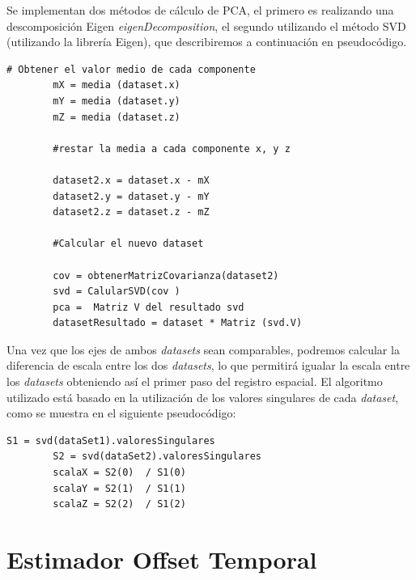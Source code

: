 	Se implementan dos métodos de cálculo de PCA, el primero es realizando una descomposición Eigen \textit{eigenDecomposition}, el segundo utilizando el método SVD (utilizando la librería Eigen), que describiremos a continuación en pseudocódigo.

	\begin{lstlisting}[frame=single]
		# Obtener el valor medio de cada componente
		mX = media (dataset.x)
		mY = media (dataset.y)
		mZ = media (dataset.z)

		#restar la media a cada componente x, y z

		dataset2.x = dataset.x - mX
		dataset2.y = dataset.y - mY
		dataset2.z = dataset.z - mZ
        
        #Calcular el nuevo dataset

		cov = obtenerMatrizCovarianza(dataset2)
		svd = CalularSVD(cov )
		pca =  Matriz V del resultado svd
		datasetResultado = dataset * Matriz (svd.V)

	\end{lstlisting}

    Una vez que los ejes de ambos \textit{datasets} sean comparables, podremos calcular la diferencia de escala entre los dos \textit{datasets}, lo que permitirá igualar la escala entre los \textit{datasets} obteniendo así el primer paso del registro espacial. El algoritmo utilizado está basado en la utilización de los valores singulares de cada \textit{dataset}, como se muestra en el siguiente pseudocódigo:

        
	\begin{lstlisting}[frame=single]
		S1 = svd(dataSet1).valoresSingulares
		S2 = svd(dataSet2).valoresSingulares
		scalaX = S2(0)  / S1(0)
		scalaY = S2(1)  / S1(1)
		scalaZ = S2(2)  / S1(2)
	\end{lstlisting}

\section{Estimador Offset Temporal}

